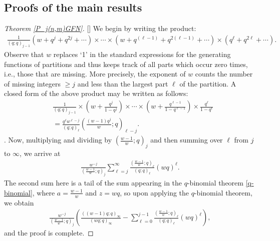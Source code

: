 \documentclass[12pt,reqno]{amsart}
\renewcommand{\(}{\left\(}
\renewcommand{\)}{\right\)}
\renewcommand{\[}{\left\[}
\renewcommand{\]}{\right\]}
\numberwithin{equation}{section}
\theoremstyle{plain}
\begin{document}
\subsection{Proofs of the main results}
\begin{proof}[Theorem \textup{\ref{P_j(n,m)GFN}}][]
We begin by writing the product: 
\begin{align*}
\frac{1}{(q;q)_{j-1}}(w+q^j+q^{2j}+\cdots)\times \cdots \times (w+q^{(\ell-1)}+q^{2(\ell-1)}+\cdots)\times(q^{\ell}+q^{2\ell}+\cdots).
\end{align*}
Observe that $w$ replaces `1' in the standard expressions for the generating functions of partitions and thus keeps track of all parts which occur zero times, i.e., those that are missing. More precisely, the exponent of $w$ counts the number of missing integers $\geq j$ and less than the largest part $\ell$ of the partition. A closed form of the above product may be written as follows:
\begin{align*}
&\frac{1}{(q;q)_{j-1}} \times \left(w + \frac{q^j}{1 - q^j} \right) \times \cdots \times \left(w + \frac{q^{\ell - 1}}{1 - q^{\ell - 1}}\right) \times \frac{q^{\ell}}{1 - q^{\ell}} \\
& =\frac{q^{\ell}w^{\ell-j}}{(q;q)_{\ell}}\left(\frac{(w-1)q^j}{w};q\right)_{\ell-j}.
\end{align*}.
Now, multiplying and dividing by $(\frac{w-1}{w};q)_j$ and then summing over $\ell$ from $j$ to $\infty$, we arrive at 
\begin{align*}
\frac{w^{-j}}{(\frac{w-1}{w};q)_j}\sum_{\ell=j}^{\infty}\frac{(\frac{w-1}{w};q)_{\ell}}{(q;q)_{\ell}}(wq)^{\ell}.
\end{align*}
The second sum here is a tail of the sum appearing in the $q$-binomial theorem \eqref{q-binomial}, where $a=\frac{w-1}{w}$ and $z=wq$, so upon applying the $q$-binomial theorem, we obtain
\begin{align*}
\frac{w^{-j}}{(\frac{w-1}{w};q)_j}\left(\frac{((w-1)q;q)_{\infty}}{(wq;q)_{\infty}}-\sum_{\ell=0}^{j-1}\frac{(\frac{w-1}{w};q)_{\ell}}{(q;q)_\ell}(wq)^\ell\right),
\end{align*}
and the proof is complete.
\end{proof}
\end{document}
